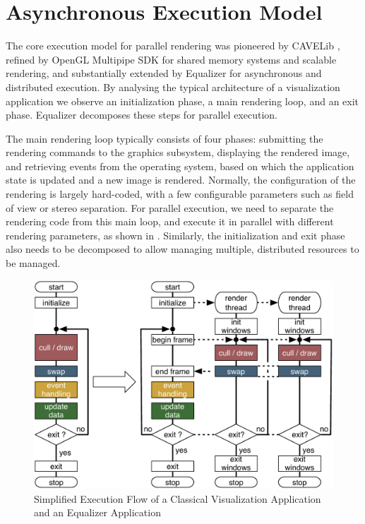\section{Asynchronous Execution Model}\label{sAsyncExec}

The core execution model for parallel rendering was pioneered by CAVELib
\cite{DACNCCGHPSNS:97}, refined by OpenGL Multipipe SDK for shared memory
systems and scalable rendering, and substantially extended by Equalizer for
asynchronous and distributed execution. By analysing the typical architecture of
a visualization application we observe an initialization phase, a main rendering
loop, and an exit phase. Equalizer decomposes these steps for parallel
execution.

The main rendering loop typically consists of four phases: submitting the
rendering commands to the graphics subsystem, displaying the rendered image,
and retrieving events from the operating system, based on which the application
state is updated and a new image is rendered. Normally, the configuration of
the rendering is largely hard-coded, with a few configurable parameters such as field of
view or stereo separation. For parallel execution, we need to separate the
rendering code from this main loop, and execute it in parallel with different
rendering parameters, as shown in . Similarly, the
initialization and exit phase also needs to be decomposed to allow managing
multiple, distributed resources to be managed.

\begin{figure}[ht]\center
 \includegraphics[width=.9\columnwidth]{images/executionFlow}
 \caption{Simplified Execution Flow of a Classical Visualization Application
  and an Equalizer Application}
 \label{FIG_execution}
\end{figure}

